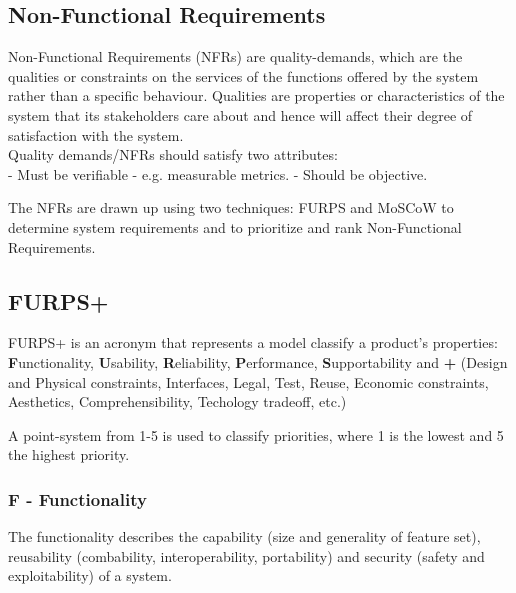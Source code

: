 



\subsection{Non-Functional Requirements}
Non-Functional Requirements (NFRs) are quality-demands, which are the qualities or constraints on the services of the functions offered by the system rather than a specific behaviour. Qualities are properties or characteristics of the system that its stakeholders care about and hence will affect their degree of satisfaction with the system. \\
Quality demands/NFRs should satisfy two attributes: \\
- Must be verifiable - e.g. measurable metrics.
- Should be objective. \newline

The NFRs are drawn up using two techniques: FURPS and MoSCoW to determine system requirements and to prioritize and rank Non-Functional Requirements. \\

\subsection{FURPS+}
FURPS+ is an acronym that represents a model classify a product's properties: \textbf{F}unctionality, \textbf{U}sability, \textbf{R}eliability, \textbf{P}erformance, \textbf{S}upportability and \textbf{+} (Design and Physical constraints, Interfaces, Legal, Test, Reuse, Economic constraints, Aesthetics, Comprehensibility, Techology tradeoff, etc.)  \newline

A point-system from 1-5 is used to classify priorities, where 1 is the lowest and 5 the highest priority. \\

\subsubsection{\textbf{F} - Functionality}
The functionality describes the capability (size and generality of feature set), reusability (combability, interoperability, portability) and security (safety and exploitability) of a system. \\

